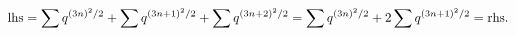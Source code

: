\begin{equation*}
  {\rm lhs} = \sum q^{(3n)^2/2} +\sum q^{(3n+1)^2/2} +\sum q^{(3n+2)^2/2} 
=  \sum q^{(3n)^2/2} + 2 \sum q^{(3n+1)^2/2} = {\rm rhs}.
\end{equation*} 

